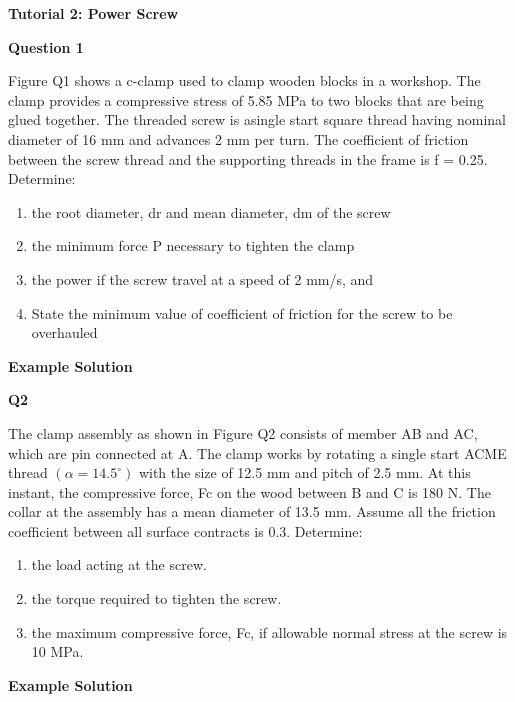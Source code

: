 \documentclass[a4paper]{article}
\begin{document}
\textbf{Tutorial 2: Power Screw}
\vspace{10pt}

\textbf{Question 1}

Figure Q1 shows a c-clamp used to clamp wooden blocks in a workshop. The clamp provides a compressive stress of 5.85 MPa to two blocks that are being glued together. The threaded screw is asingle start square thread having nominal diameter of 16 mm and advances 2 mm per turn. The coefficient of friction between the screw thread and the supporting threads in the frame is f = 0.25.
Determine:
\begin{enumerate}[label=(\roman*)]
    \item the root diameter, dr and mean diameter, dm of the screw
    \item the minimum force P necessary to tighten the clamp
    \item the power if the screw travel at a speed of 2 mm/s, and
    \item State the minimum value of coefficient of friction for the screw to be overhauled
\end{enumerate}

\textbf{Example Solution}



\newpage
\textbf{Q2}

The clamp assembly as shown in Figure Q2 consists of member AB and AC, which are pin connected at A. The clamp works by rotating a single start ACME thread $(\alpha=14.5^{\circ})$ with the size of 12.5 mm and pitch of 2.5 mm. At this instant, the compressive force, Fc on the wood between B and C is 180 N. The collar at the assembly has a mean diameter of 13.5 mm. Assume all the friction coefficient between all surface contracts is 0.3. Determine:

\begin{enumerate}[label=(\roman*)]
    \item the load acting at the screw.

    \item the torque required to tighten the screw.

    \item the maximum compressive force, Fc, if allowable normal stress at the screw is 10 MPa.
\end{enumerate}


\textbf{Example Solution}
\end{document}
